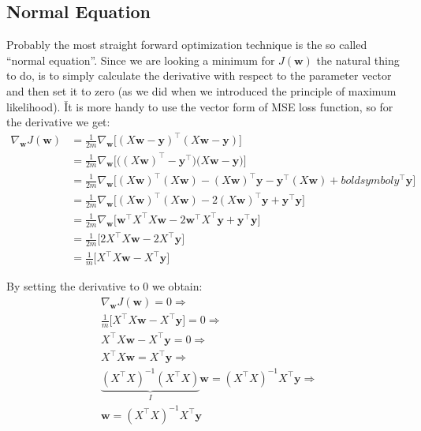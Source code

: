 \subsection{Normal Equation}

Probably the most straight forward optimization technique is the so called ``normal equation''. Since we are
looking a minimum for $J(\boldsymbol{w})$ the natural thing to do, is to simply calculate the derivative with respect
to the parameter vector and then set it to zero (as we did when we introduced the principle of maximum likelihood). \v

It is more handy to use the vector form of MSE loss function, so for the derivative we get:
{\setlength{\jot}{10pt}
\begin{align*}
\nabla_{\boldsymbol{w}} J(\boldsymbol{w})
&= \frac{1}{2m} \nabla_{\boldsymbol{w}} \Big[ (X \boldsymbol{w} -
\boldsymbol{y})^{\intercal} (X \boldsymbol{w} - \boldsymbol{y}) \Big] \\
&= \frac{1}{2m} \nabla_{\boldsymbol{w}} \Big[ \Big( (X \boldsymbol{w})^{\intercal} -
\boldsymbol{y}^{\intercal} \Big) \Big( X \boldsymbol{w} - \boldsymbol{y} \Big) \Big] \\
&= \frac{1}{2m} \nabla_{\boldsymbol{w}} \Big[ (X \boldsymbol{w})^{\intercal} (X \boldsymbol{w}) -
(X\boldsymbol{w})^{\intercal} \boldsymbol{y} - \boldsymbol{y}^{\intercal}(X \boldsymbol{w}) +
boldsymbol{y}^{\intercal} \boldsymbol{y} \Big] \\
&= \frac{1}{2m} \nabla_{\boldsymbol{w}} \Big[ (X \boldsymbol{w})^{\intercal} (X \boldsymbol{w}) -
2 (X\boldsymbol{w})^{\intercal} \boldsymbol{y} + \boldsymbol{y}^{\intercal}\boldsymbol{y} \Big] \\
&= \frac{1}{2m} \nabla_{\boldsymbol{w}} \Big[ \boldsymbol{w}^{\intercal} X^{\intercal} X \boldsymbol{w} -
2\boldsymbol{w}^{\intercal} X^{\intercal} \boldsymbol{y} +\boldsymbol{y}^{\intercal} \boldsymbol{y} \Big] \\
&= \frac{1}{2m} \Big[ 2 X^{\intercal} X \boldsymbol{w} - 2 X^{\intercal}\boldsymbol{y} \Big] \\
&= \frac{1}{m} \Big[ X^{\intercal} X \boldsymbol{w} - X^{\intercal}\boldsymbol{y} \Big]
\end{align*}}

By setting the derivative to 0 we obtain:
{\setlength{\jot}{10pt}
\begin{align*}
& \nabla_{\boldsymbol{w}} J(\boldsymbol{w}) = 0 \Rightarrow \\
& \frac{1}{m} \Big[ X^{\intercal} X \boldsymbol{w} - X^{\intercal} \boldsymbol{y} \Big] = 0 \Rightarrow \\
& X^{\intercal} X \boldsymbol{w} - X^{\intercal} \boldsymbol{y} = 0 \Rightarrow \\
& X^{\intercal} X \boldsymbol{w} = X^{\intercal} \boldsymbol{y} \Rightarrow \\
& \underbrace{(X^{\intercal} X)^{-1} (X^{\intercal} X)}_{I} \boldsymbol{w} =
(X^{\intercal} X)^{-1} X^{\intercal} \boldsymbol{y} \Rightarrow \\
& \boldsymbol{w} = (X^{\intercal} X)^{-1} X^{\intercal} \boldsymbol{y}
\end{align*}}


